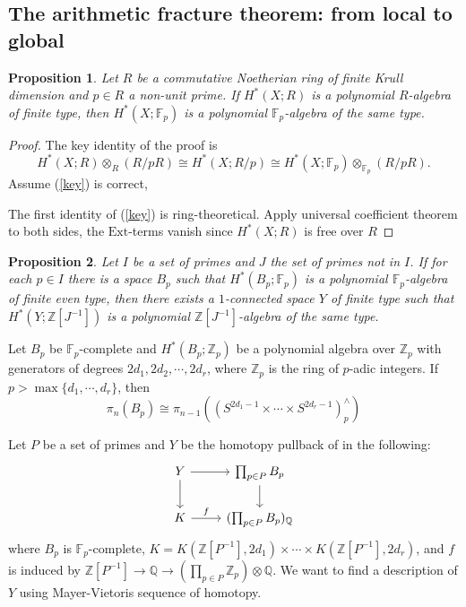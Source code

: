 \documentclass[psamsfonts]{amsart}
\newtheorem{prop}{Proposition}[section]
\theoremstyle{definition}
\newcommand{\Q}{\mathbb{Q}}
\newcommand{\Z}{\mathbb{Z}}
\newcommand{\F}{\mathbb{F}}
\numberwithin{equation}{section}
\begin{document}
\subsection{The arithmetic fracture theorem: from local to global}

\begin{prop}
Let $R$ be a commutative Noetherian ring of finite Krull dimension and $p\in R$ a non-unit prime. If $H^\ast(X;R)$ is a polynomial $R$-algebra of finite type, then $H^\ast(X;\F_p)$ is a polynomial $\F_p$-algebra of the same type.
\end{prop}
\begin{proof}
The key identity of the proof is
\begin{equation}\label{key} H^\ast(X;R)\otimes_R (R/pR)\cong H^\ast(X;R/p)\cong H^\ast(X;\F_p)\otimes_{\F_p}(R/pR).
\end{equation}
Assume (\ref{key}) is correct, \medbreak

The first identity of (\ref{key}) is ring-theoretical. Apply universal coefficient theorem to both sides, the $\mathrm{Ext}$-terms vanish since $H^\ast(X;R)$ is free over $R$
\end{proof}


\begin{prop}
Let $I$ be a set of primes and $J$ the set of primes not in $I$. If for each $p\in I$ there is a space $B_p$ such that $H^\ast(B_p;\F_p)$ is a polynomial $\F_p$-algebra of finite even type, then there exists a $1$-connected space $Y$ of finite type such that $H^\ast(Y;\Z[J^{-1}])$ is a polynomial $\Z[J^{-1}]$-algebra of the same type.
\end{prop}

Let $B_p$ be $\F_p$-complete and $H^\ast(B_p;\Z_p)$ be a polynomial algebra over $\Z_p$ with generators of degrees $2d_1,2d_2,\cdots,2d_r$, where $\Z_p$ is the ring of $p$-adic integers. If $p>\max\{d_1,\cdots,d_r\}$, then
\[\pi_n(B_p)\cong\pi_{n-1}\left((S^{2d_1-1}\times\cdots\times S^{2d_r-1})_p^\wedge\right)\]\medbreak

\noindent Let $P$ be a set of primes and $Y$ be the homotopy pullback of in the following:
\[\begin{tikzcd}
Y\arrow[r]\arrow[d]&\prod_{p\in P}B_p\arrow[d]\\
K\arrow[r,"f"]&(\prod_{p\in P}B_p)_\Q
\end{tikzcd}\]
where $B_p$ is $\F_p$-complete, $K=K(\Z[P^{-1}],2d_1)\times\cdots\times K(\Z[P^{-1}],2d_r)$, and $f$ is induced by $\Z[P^{-1}]\to\Q\to(\prod_{p\in P}\Z_p)\otimes\Q$. We want to find a description of $Y$ using Mayer-Vietoris sequence of homotopy.\medbreak
\end{document}
